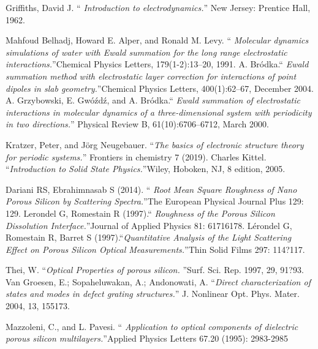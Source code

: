 \documentclass{article}
\begin{document}
\begin{thebibliography}{X}
Griffiths, David J. \textquotedblleft 
\emph{Introduction to electrodynamics.}\textquotedblright 
 New Jersey: Prentice Hall, 1962.  
 
  Mahfoud Belhadj, Howard E. Alper, and Ronald M. Levy. \textquotedblleft 
 \emph{ Molecular dynamics simulations of water with Ewald summation 
 	for the long range electrostatic interactions.}\textquotedblright Chemical
  Physics Letters, 179(1-2):13–20, 1991.
   A. Bródka.\textquotedblleft 
   \emph{ Ewald summation method with electrostatic layer correction for
  interactions of point dipoles in slab geometry.}\textquotedblright Chemical 
Physics Letters, 400(1):62–67, December 2004.
  A. Grzybowski, E. Gwóźdź, and A. Bródka.\textquotedblleft 
 \emph{ Ewald summation of electrostatic interactions in molecular dynamics
 	 of a three-dimensional system with periodicity in two directions.}\textquotedblright 
  Physical Review B, 61(10):6706–6712, March 2000.
  
  Kratzer, Peter, and Jörg Neugebauer. \textquotedblleft \emph{The basics of 
 	electronic structure theory for periodic systems.}\textquotedblright 
  Frontiers in chemistry 7 (2019).
  Charles Kittel. \textquotedblleft \emph{Introduction to Solid State
 	 Physics.}\textquotedblright Wiley, Hoboken, NJ, 8 edition, 2005.
  
  
  
  
 Dariani RS, Ebrahimnasab S (2014). \textquotedblleft
  \emph{Root Mean Square Roughness of Nano Porous Silicon by
    Scattering Spectra.}\textquotedblright The
  European Physical Journal Plus 129: 129.
 Lerondel G, Romestain R (1997).\textquotedblleft
  \emph{Roughness of the Porous Silicon Dissolution
    Interface.}\textquotedblright Journal of Applied Physics 81:
  61716178.
 Lérondel G, Romestain R, Barret S
  (1997).\textquotedblleft \emph{Quantitative Analysis of the Light
    Scattering Effect on Porous Silicon
    Optical Measurements.}\textquotedblright Thin Solid Films 297:
  114?117.

 Thei, W. \textquotedblleft \emph{Optical Properties of porous silicon.}
\textquotedblright Surf. Sci. Rep. 1997, 29, 91?93.
 Van Groesen, E.; Sopaheluwakan, A.; Andonowati,
  A. \textquotedblleft  \emph{Direct characterization of states and
    modes in defect grating structures.}\textquotedblright
  J. Nonlinear Opt. Phys. Mater. 2004, 13, 155173.

 Mazzoleni, C., and L. Pavesi. \textquotedblleft
  \emph{Application to optical components of dielectric porous silicon
    multilayers.}\textquotedblright Applied Physics Letters 67.20
  (1995): 2983-2985

\end{thebibliography}
\end{document}
